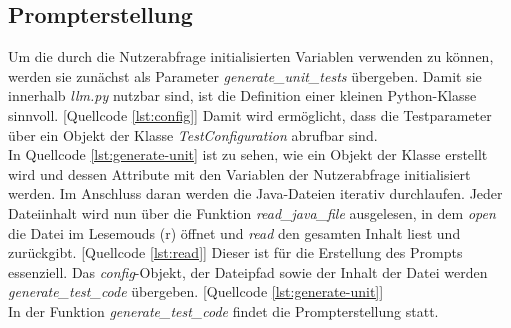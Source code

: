 \subsection{Prompterstellung}
Um die durch die Nutzerabfrage initialisierten Variablen verwenden zu können, werden sie zunächst als Parameter \textit{generate\_unit\_tests} übergeben. Damit sie innerhalb \textit{llm.py} nutzbar sind, ist die Definition einer kleinen Python-Klasse sinnvoll. [Quellcode \ref{lst:config}] Damit wird ermöglicht, dass die Testparameter über ein Objekt der Klasse \textit{TestConfiguration} abrufbar sind.\\
\vspace{-.3cm}
In Quellcode \ref{lst:generate-unit} ist zu sehen, wie ein Objekt der Klasse erstellt wird und dessen Attribute mit den Variablen der Nutzerabfrage initialisiert werden. Im Anschluss daran werden die Java-Dateien iterativ durchlaufen. Jeder Dateiinhalt wird nun über die Funktion \textit{read\_java\_file} ausgelesen, in dem \textit{open} die Datei im Lesemouds (r) öffnet und \textit{read} den gesamten Inhalt liest und zurückgibt. [Quellcode \ref{lst:read}] Dieser ist für die Erstellung des Prompts essenziell. Das \textit{config}-Objekt, der Dateipfad sowie der Inhalt der Datei werden \textit{generate\_test\_code} übergeben. [Quellcode \ref{lst:generate-unit}]\\
\vspace{1cm}
\vspace{-.3cm}
In der Funktion \textit{generate\_test\_code} findet die Prompterstellung statt.